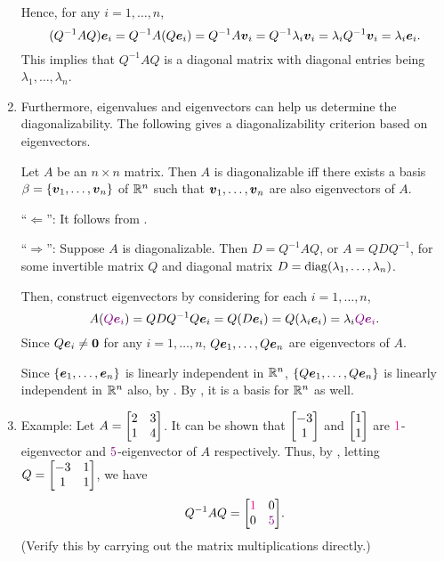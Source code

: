 \begin{enumerate}
\begin{pf}
Hence, for any \(i=1,\dotsc,n\),
\[
(Q^{-1}AQ)\vb*{e}_i=Q^{-1}A(Q\vb*{e}_i)
=Q^{-1}A\vb*{v}_i
=Q^{-1}\lambda_i\vb*{v}_i
=\lambda_iQ^{-1}\vb*{v}_i
=\lambda_i\vb*{e}_i.
\]
This implies that \(Q^{-1}AQ\) is a diagonal matrix with diagonal entries
being \(\lambda_1,\dotsc,\lambda_n\).
\end{pf}

\item Furthermore, eigenvalues and eigenvectors can help us determine the
diagonalizability. The following gives a diagonalizability criterion based on
eigenvectors.

\begin{theorem}
\label{thm:diag-crit}
Let \(A\) be an \(n\times n\) matrix. Then \(A\) is diagonalizable iff there
exists a basis \(\beta=\{\vb*{v}_1,\dotsc,\vb*{v}_n\}\) of \(\mathbb{R}^n\) such that
\(\vb*{v}_1,\dotsc,\vb*{v}_n\) are also eigenvectors of \(A\).
\end{theorem}
\begin{pf}
``\(\Leftarrow\)'': It follows from .

``\(\Rightarrow\)'': Suppose \(A\) is diagonalizable. Then \(D=Q^{-1}AQ\), or
\(A=QDQ^{-1}\), for some invertible matrix \(Q\) and diagonal matrix
\(D=\operatorname{diag}(\lambda_1,\dotsc,\lambda_n)\).

Then, construct eigenvectors by considering for each \(i=1,\dotsc,n\),
\[
A({\color{violet}Q\vb*{e}_i})=QDQ^{-1}Q\vb*{e}_i=Q(D\vb*{e}_i)=Q(\lambda_i\vb*{e}_i)=\lambda_i{\color{violet}Q\vb*{e}_i}.
\]
Since \(Q\vb*{e}_i\ne\vb*{0}\) for any \(i=1,\dotsc,n\),
\(Q\vb*{e}_1,\dotsc,Q\vb*{e}_n\) are eigenvectors of \(A\).

Since \(\{\vb*{e}_1,\dotsc,\vb*{e}_n\}\) is linearly independent in \(\mathbb{R}^n\),
\(\{Q\vb*{e}_1,\dotsc,Q\vb*{e}_n\}\) is linearly independent in \(\mathbb{R}^n\)
also, by . By ,
it is a basis for \(\mathbb{R}^n\) as well.
\end{pf}

\item Example: Let \(A=\mqty[2&3\\ 1&4]\). It can be shown that \(\mqty[-3\\
1]\) and \(\mqty[1\\ 1]\) are \({\color{magenta}1}\)-eigenvector and
\({\color{violet}5}\)-eigenvector of \(A\) respectively. Thus, by ,
letting \(Q=\mqty[-3&1\\ 1&1]\), we have
\[
Q^{-1}AQ=\mqty[\mgc{1}&0\\ 0&\vc{5}].
\]
(Verify this by carrying out the matrix multiplications directly.)


\end{enumerate}
